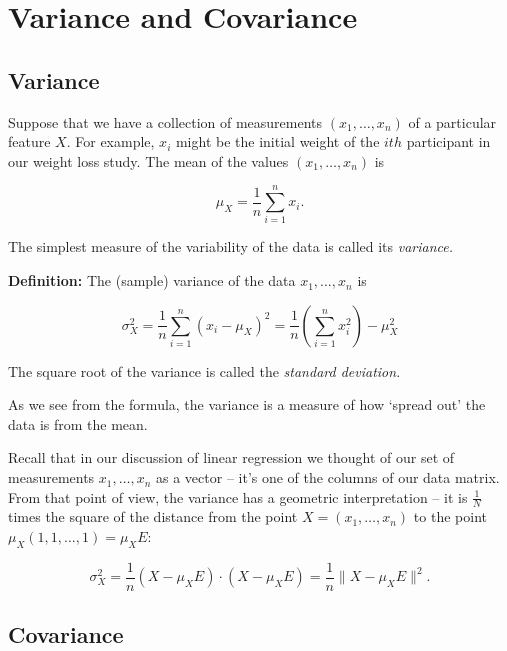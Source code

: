 \documentclass[
  oneside]{scrbook}
\begin{document}
\hypertarget{variance-and-covariance}{%
\section{Variance and Covariance}\label{variance-and-covariance}}

\hypertarget{variance}{%
\subsection{Variance}\label{variance}}

Suppose that we have a collection of measurements \((x_1,\ldots, x_n)\)
of a particular feature \(X\). For example, \(x_i\) might be the initial
weight of the \(ith\) participant in our weight loss study. The mean of
the values \((x_1,\ldots, x_n)\) is

\[
\mu_{X} = \frac{1}{n}\sum_{i=1}^{n} x_{i}.
\]

The simplest measure of the variability of the data is called its
\emph{variance.}

\textbf{Definition:} The (sample) variance of the data
\(x_1,\ldots, x_n\) is

\begin{equation}
\sigma_{X}^2 = \frac{1}{n}\sum_{i=1}^{n} \left(x_{i}-\mu_{X}\right)^2 = \frac{1}{n}\left(\sum_{i=1}^{n} x_{i}^2\right)- \mu_{X}^2
\label{eq:variance}\end{equation}

The square root of the variance is called the \emph{standard deviation.}

As we see from the formula, the variance is a measure of how `spread
out' the data is from the mean.

Recall that in our discussion of linear regression we thought of our set
of measurements \(x_1,\ldots, x_n\) as a vector -- it's one of the
columns of our data matrix. From that point of view, the variance has a
geometric interpretation -- it is \(\frac{1}{N}\) times the square of
the distance from the point \(X=(x_1,\ldots, x_n)\) to the point
\(\mu_{X}(1,1,\ldots,1)=\mu_{X}E\):

\begin{equation}
\sigma_{X}^2 = \frac{1}{n}(X-\mu_{X}E)\cdot(X-\mu_{X}E)  = \frac{1}{n}\|X-\mu_{X}E\|^2.
\label{eq:variancedot}\end{equation}

\hypertarget{covariance}{%
\subsection{Covariance}\label{covariance}}
\end{document}
